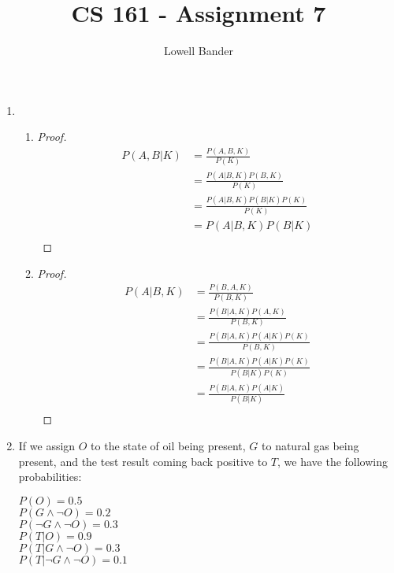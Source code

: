 \documentclass[]{article}
\begin{document}
\title{CS 161 - Assignment 7}
\author{Lowell Bander}
\maketitle

\begin{enumerate}
\item \begin{enumerate}
\item \begin{proof}
\begin{align}
P(A,B|K) &= \frac{P(A,B,K)}{P(K)} \\
&= \frac{P(A|B,K)P(B,K)}{P(K)}\\
&= \frac{P(A|B,K)P(B|K)P(K)}{P(K)}\\
&= P(A|B,K)P(B|K)\\
\end{align} \end{proof}
\item \begin{proof}
\begin{align}
P(A|B,K) &= \frac{P(B,A,K)}{P(B,K)}\\
&= \frac{P(B|A,K)P(A,K)}{P(B,K)}\\
&= \frac{P(B|A,K)P(A|K)P(K)}{P(B,K)}\\
&= \frac{P(B|A,K)P(A|K)P(K)}{P(B|K)P(K)}\\
&= \frac{P(B|A,K)P(A|K)}{P(B|K)}\\
\end{align}
\end{proof}
\end{enumerate}
\newpage
\item If we assign $O$ to the state of oil being present, $G$ to natural gas being present, and the test result coming back positive to $T$, we have the following probabilities:
\begin{multicols}{2}
$P(O)=0.5$\\
$P(G \land \neg O)=0.2$\\
$P(\neg G \land \neg O)=0.3$\\
$P(T|O)=0.9$\\
$P(T|G\land \neg O)=0.3$\\
$P(T|\neg G\land\neg O)=0.1$
\end{multicols}


\end{enumerate}
\end{document}
